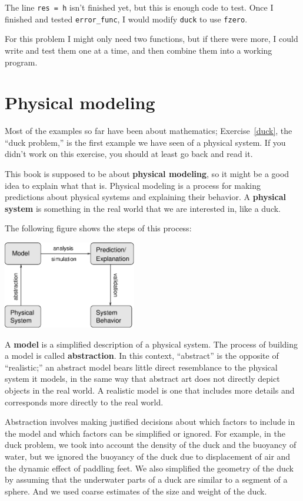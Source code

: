 \documentclass{book}
\begin{document}
The line {\tt res = h} isn't finished yet, but this
is enough code to test.
Once I finished and tested {\tt error\_func}, I would modify
{\tt duck} to use {\tt fzero}.

For this problem I might only need two functions, but if there
were more, I could write and test them one at a time, and then
combine them into a working program.



\section{Physical modeling}
\label{modeling}

Most of the examples so far have been about mathematics;
Exercise~\ref{duck}, the ``duck problem,'' is the first example we
have seen of a physical system.  If you didn't work on this exercise,
you should at least go back and read it.

This book is supposed to be about {\bf physical modeling}, so it might
be a good idea to explain what that is.  Physical modeling is a process
for making predictions about physical systems and explaining their
behavior.  A {\bf physical system} is something in the real
world that we are interested in, like a duck.

The following figure shows the steps of this process:

\beforefig \centerline{\includegraphics[height=1.5in]{figs/model.eps}}

A {\bf model} is a simplified description of a physical system.  The
process of building a model is called {\bf abstraction}.  In this
context, ``abstract'' is the opposite of ``realistic;'' an abstract
model bears little direct resemblance to the physical system it
models, in the same way that abstract art does not directly depict
objects in the real world.  A realistic model is one that includes
more details and corresponds more directly to the real world.

Abstraction involves making justified decisions about which factors to
include in the model and which factors can be simplified or ignored.
For example, in the duck problem, we took into account the density of
the duck and the buoyancy of water, but we ignored the buoyancy of the
duck due to displacement of air and the dynamic effect of paddling
feet.  We also simplified the geometry of the duck by assuming that
the underwater parts of a duck are similar to a segment of a sphere.
And we used coarse estimates of the size and weight of the duck.
\end{document}
